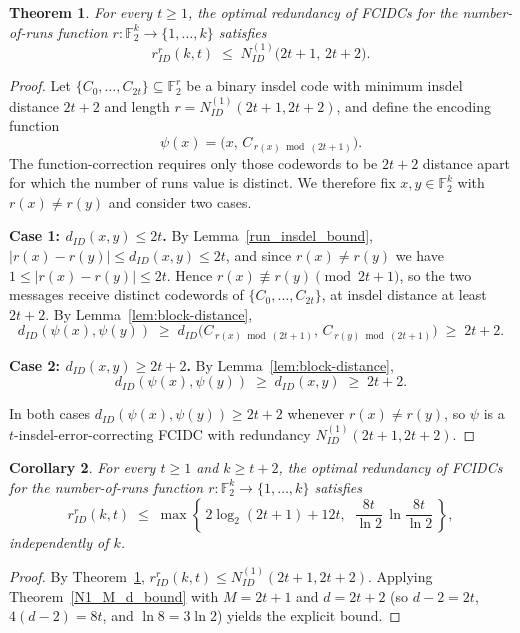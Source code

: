 \documentclass[11 pt]{article}
\numberwithin{equation}{section}
\newtheorem{theorem}{Theorem}[section]
\newtheorem{corollary}[theorem]{Corollary}
\begin{document}
    \begin{theorem}
    \label{thm:runs-construction}
    For every $t\ge 1$, the optimal redundancy of FCIDCs for the number-of-runs function $r:\mathbb{F}_2^{k}\to\{1,\dots,k\}$ satisfies
    \[
    r^{r}_{ID}(k,t)\;\le\;N^{(1)}_{ID}\big(2t+1,\,2t+2\big).
    \]
    \end{theorem}

    \begin{proof}
    Let $\{C_0,\dots,C_{2t}\}\subseteq\mathbb{F}_2^{r}$ be a binary insdel code with minimum insdel distance $2t+2$ and length $r=N^{(1)}_{ID}(2t+1,2t+2)$, and define the encoding function
    \[
    \psi(x)=\big(x,\,C_{\,r(x)\bmod(2t+1)}\big).
    \]
    The function-correction requires only those codewords to be $2t+2$ distance apart for which the number of runs value is distinct. We therefore fix $x,y\in\mathbb{F}_2^{k}$ with $r(x)\ne r(y)$ and consider two cases.

    \smallskip
    \noindent\textbf{Case 1: $d_{ID}(x,y)\le 2t$.}
    By Lemma~\ref{run_insdel_bound}, $|r(x)-r(y)|\le d_{ID}(x,y)\le 2t$, and since $r(x)\ne r(y)$ we have $1\le|r(x)-r(y)|\le 2t$. Hence $r(x)\not\equiv r(y)\pmod{2t+1}$, so the two messages receive distinct codewords of $\{C_0,\dots,C_{2t}\}$, at insdel distance at least $2t+2$. By Lemma~\ref{lem:block-distance},
    \[
    d_{ID}(\psi(x),\psi(y))
    \;\ge\; d_{ID}\big(C_{\,r(x)\bmod(2t+1)},\,C_{\,r(y)\bmod(2t+1)}\big)
    \;\ge\; 2t+2.
    \]

    \smallskip
    \noindent\textbf{Case 2: $d_{ID}(x,y)\ge 2t+2$.}
    By Lemma~\ref{lem:block-distance},
    \[
        d_{ID}(\psi(x),\psi(y))\;\ge\;d_{ID}(x,y)\;\ge\;2t+2.
    \]

    \smallskip
    In both cases $d_{ID}(\psi(x),\psi(y))\ge 2t+2$ whenever $r(x)\ne r(y)$, so $\psi$ is a $t$-insdel-error-correcting FCIDC with redundancy $N^{(1)}_{ID}(2t+1,2t+2)$.
    \end{proof}

    \begin{corollary}\label{cor:runs-explicit}
    For every $t\ge 1$ and $k\ge t+2$, the optimal redundancy of FCIDCs for the number-of-runs function $r:\mathbb{F}_2^{k}\to\{1,\dots,k\}$ satisfies
    \[
    r^{r}_{ID}(k,t)\;\le\;
    \max\!\left\{\,2\log_2(2t+1)+12t,\;\;
    \frac{8t}{\ln 2}\,\ln\!\frac{8t}{\ln 2}\,\right\},
    \]
    independently of $k$.
    \end{corollary}

    \begin{proof} By Theorem~\ref{thm:runs-construction}, $r^{r}_{ID}(k,t)\le N^{(1)}_{ID}(2t+1,2t+2)$. Applying Theorem~\ref{N1_M_d_bound} with $M=2t+1$ and $d=2t+2$ (so $d-2=2t$, $4(d-2)=8t$, and $\ln 8=3\ln 2$) yields the explicit bound. 
    \end{proof}
\end{document}
